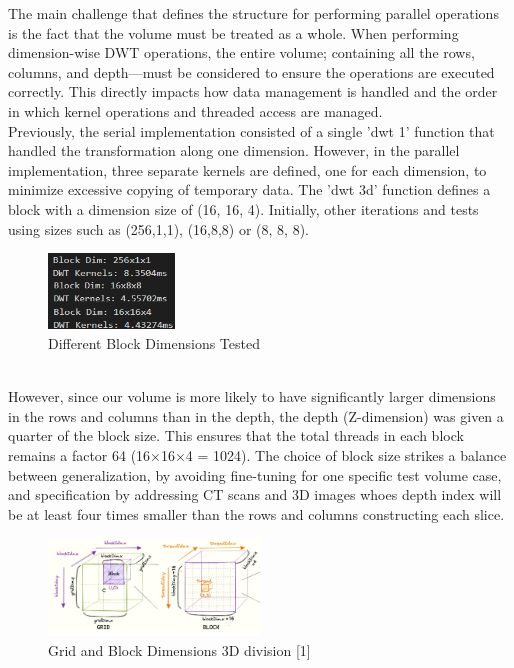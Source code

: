 \documentclass[journal,11pt]{IEEEtran}
\begin{document}
The main challenge that defines the structure for performing parallel operations is the fact that the volume must be treated as a whole. When performing dimension-wise DWT operations, the entire volume; containing all the rows, columns, and depth—must be considered to ensure the operations are executed correctly. This directly impacts how data management is handled and the order in which kernel operations and threaded access are managed.\\

Previously, the serial implementation consisted of a single 'dwt 1' function that handled the transformation along one dimension. However, in the parallel implementation, three separate kernels are defined, one for each dimension, to minimize excessive copying of temporary data. The 'dwt 3d' function defines a block with a dimension size of (16, 16, 4). Initially, other iterations and tests using sizes such as (256,1,1), (16,8,8) or (8, 8, 8). 
\vspace{-1.5em}
\begin{figure}[h]
    \centering
    \includegraphics[width=0.3\textwidth]{assets/block-dims.png}
    \caption{Different Block Dimensions Tested}
    \label{fig:0}
\end{figure}
\vspace{-0.5em}\\
However, since our volume is more likely to have significantly larger dimensions in the rows and columns than in the depth, the depth (Z-dimension) was given a quarter of the block size. This ensures that the total threads in each block remains a factor 64 (16×16×4 = 1024). The choice of block size strikes a balance between generalization, by avoiding fine-tuning for one specific test volume case, and specification by addressing CT scans and 3D images whoes depth index will be at least four times smaller than the rows and columns constructing each slice.
\vspace{-1.2em}
\begin{figure}[h]
    \centering
    \includegraphics[width=0.5\textwidth]{assets/grid_block.png}
    \caption{Grid and Block Dimensions 3D division [1]}
    \label{fig:1}
\end{figure}
\end{document}
